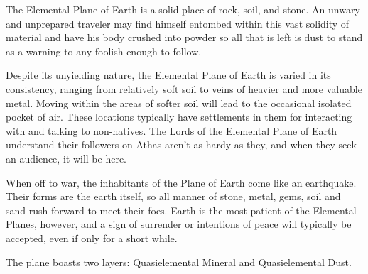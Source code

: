 The Elemental Plane of Earth is a solid place of rock, soil, and stone. An unwary and unprepared traveler may find himself entombed within this vast solidity of material and have his body crushed into powder so all that is left is dust to stand as a warning to any foolish enough to follow.

Despite its unyielding nature, the Elemental Plane of Earth is varied in its consistency, ranging from relatively soft soil to veins of heavier and more valuable metal. Moving within the areas of softer soil will lead to the occasional isolated pocket of air. These locations typically have settlements in them for interacting with and talking to non-natives. The Lords of the Elemental Plane of Earth understand their followers on Athas aren't as hardy as they, and when they seek an audience, it will be here.

When off to war, the inhabitants of the Plane of Earth come like an earthquake. Their forms are the earth itself, so all manner of stone, metal, gems, soil and sand rush forward to meet their foes. Earth is the most patient of the Elemental Planes, however, and a sign of surrender or intentions of peace will typically be accepted, even if only for a short while.

The plane boasts two layers: Quasielemental Mineral and Quasielemental Dust.

\begin{figure}[h!]
\centering
{}
\end{figure}

